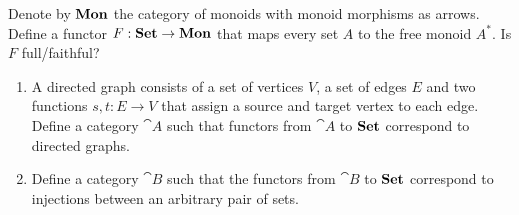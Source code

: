 \begin{exercise}
  Denote by $\mathbf{Mon}$ the category of monoids with monoid morphisms as arrows.
  Define a functor $F : \mathbf{Set} \to \mathbf{Mon}$ that maps every set $A$ to the free monoid $A^*$.
  Is $F$ full/faithful?
\end{exercise}

\begin{exercise}
  \begin{enumerate}
    \item A directed graph consists of a set of vertices $V$, a set of edges $E$ and two functions $s, t : E \to V$ that assign a source and target vertex to each edge.
      Define a category $\cat{A}$ such that functors from $\cat{A}$ to $\mathbf{Set}$ correspond to directed graphs.
    \item Define a category $\cat{B}$ such that the functors from $\cat{B}$ to $\mathbf{Set}$ correspond to injections between an arbitrary pair of sets.
  \end{enumerate}
\end{exercise}








